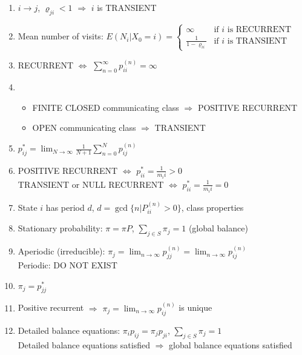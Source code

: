 \documentclass[11pt,a4paper]{article}
\begin{document}
\begin{enumerate}[resume]
\item $i \rightarrow j$, $\varrho_{ji} <1$ $\Rightarrow$ $i$ is TRANSIENT

\item Mean number of visits: $E(N_i | X_0 = i) = \begin{cases}
\infty &\text{if } i \text{ is RECURRENT} \\
\frac{1}{1-\varrho_{ii}} &\text{if } i \text{ is TRANSIENT}
\end{cases}$

\item RECURRENT $\Leftrightarrow$ $\sum_{n=0}^{\infty} p_{ii}^{(n)} = \infty$

\item \begin{itemize}
\item FINITE CLOSED communicating class $\Rightarrow$ POSITIVE RECURRENT
\item OPEN communicating class $\Rightarrow$ TRANSIENT
\end{itemize}

\item $p_{ij}^* = \lim_{N \to \infty} \frac{1}{N+1} \sum_{n=0}^N p_{ij}^{(n)}$

\item POSITIVE RECURRENT $\Leftrightarrow$ $p_{ii}^* = \frac{1}{m_ii} > 0$ \\ TRANSIENT or NULL RECURRENT $\Leftrightarrow$ $p_{ii}^* = \frac{1}{m_ii} = 0$

\item State $i$ has period $d$, $d = \gcd \{ n | P_{ii}^{(n)} >0 \}$, class properties

\item Stationary probability: $\pi = \pi P$, $\sum_{j \in S} \pi_j =1$ (global balance)

\item Aperiodic (irreducible): $\pi_j = \lim_{n \to \infty} p_{jj}^{(n)} = \lim_{n \to \infty} p_{ij}^{(n)}$\\Periodic: DO NOT EXIST

\item $\pi_j = p_{jj}^*$

\item Positive recurrent $\Rightarrow$ $\pi_j = \lim_{n \to \infty} p_{ij}^{(n)}$ is unique

\item Detailed balance equations: $\pi_i p_{ij} = \pi_j p_{ji}$, $\sum_{j \in S} \pi_j =1$ \\ Detailed balance equations satisfied $\Rightarrow$ global balance equations satisfied


\end{enumerate}
\end{document}
